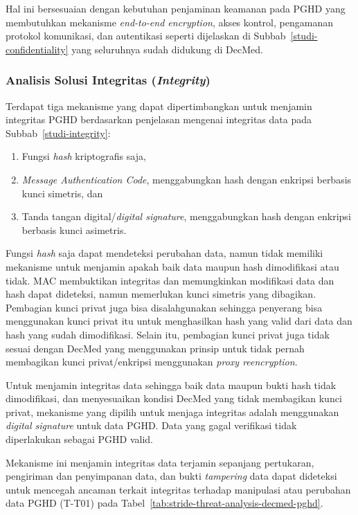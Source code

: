 Hal ini bersesuaian dengan kebutuhan penjaminan keamanan pada PGHD yang membutuhkan mekanisme \textit{end-to-end encryption}, akses kontrol, pengamanan protokol komunikasi, dan autentikasi seperti dijelaskan di Subbab~\ref{studi-confidentiality} yang seluruhnya sudah didukung di DecMed.


\subsubsection{Analisis Solusi Integritas (\textit{Integrity})}

Terdapat tiga mekanisme yang dapat dipertimbangkan untuk menjamin integritas PGHD berdasarkan penjelasan mengenai integritas data pada Subbab~\ref{studi-integrity}\@:
\begin{enumerate}
    \item Fungsi \textit{hash} kriptografis saja, 
    \item \textit{Message Authentication Code}, menggabungkan hash dengan enkripsi berbasis kunci simetris, dan 
    \item Tanda tangan digital/\textit{digital signature}, menggabungkan hash dengan enkripsi berbasis kunci asimetris. 
\end{enumerate}

Fungsi \textit{hash} saja dapat mendeteksi perubahan data, namun tidak memiliki mekanisme untuk menjamin apakah baik data maupun hash dimodifikasi atau tidak. 
MAC membuktikan integritas dan memungkinkan modifikasi data dan hash dapat dideteksi, namun memerlukan kunci simetris yang dibagikan.
Pembagian kunci privat juga bisa disalahgunakan sehingga penyerang bisa menggunakan kunci privat itu untuk menghasilkan hash yang valid dari data dan hash yang sudah dimodifikasi.
Selain itu, pembagian kunci privat juga tidak sesuai dengan DecMed yang menggunakan prinsip untuk tidak pernah membagikan kunci privat/enkripsi menggunakan \textit{proxy reencryption}. 

Untuk menjamin integritas data sehingga baik data maupun bukti hash tidak dimodifikasi, dan menyesuaikan kondisi DecMed yang tidak membagikan kunci privat, mekanisme yang dipilih untuk menjaga integritas adalah menggunakan \textit{digital signature} untuk data PGHD\@.
Data yang gagal verifikasi tidak diperlakukan sebagai PGHD valid. 

Mekanisme ini menjamin integritas data terjamin sepanjang pertukaran, pengiriman dan penyimpanan data, dan bukti \textit{tampering} data dapat dideteksi untuk mencegah ancaman terkait integritas terhadap manipulasi atau perubahan data PGHD (T-T01) pada Tabel~\ref{tab:stride-threat-analysis-decmed-pghd}.


